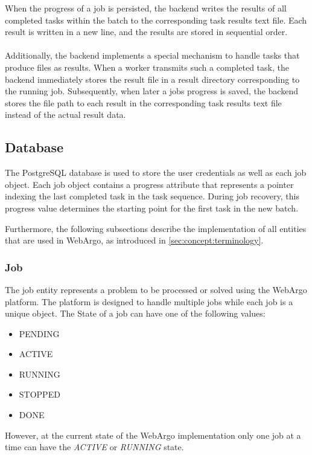 When the progress of a job is persisted, the backend writes the results of all completed tasks within the batch to the corresponding task results text file. Each result is written in a new line, and the results are stored in sequential order.
\\~\\
Additionally, the backend implements a special mechanism to handle tasks that produce files as results. When a worker transmits such a completed task, the backend immediately stores the result file in a result directory corresponding to the running job. Subsequently, when later a jobs progress is saved, the backend stores the file path to each result in the corresponding task results text file instead of the actual result data.

\subsection{Database}
The PostgreSQL \cite{methodology:db} database is used to store the user credentials as well as each job object. Each job object contains a progress attribute that represents a pointer indexing the last completed task in the task sequence. During job recovery, this progress value determines the starting point for the first task in the new batch.

Furthermore, the following subsections describe the implementation of all entities that are used in WebArgo, as introduced in \autoref{sec:concept:terminology}.

\subsubsection{Job}
The job entity represents a problem to be processed or solved using the WebArgo platform. The platform is designed to handle multiple jobs while each job is a unique object. The State of a job can have one of the following values:
\begin{itemize}
  \item PENDING
  \item ACTIVE
  \item RUNNING
  \item STOPPED
  \item DONE
\end{itemize}
However, at the current state of the WebArgo implementation only one job at a time can have the \emph{ACTIVE} or \emph{RUNNING} state.

